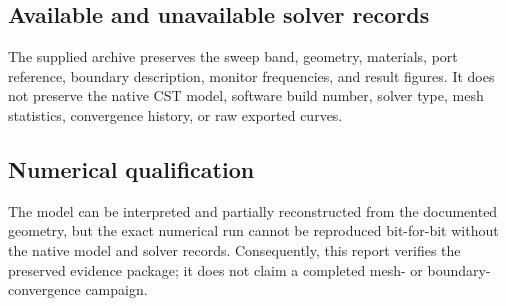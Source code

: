 \subsection{Available and unavailable solver records}
The supplied archive preserves the sweep band, geometry, materials, port reference,
boundary description, monitor frequencies, and result figures. It does not preserve the
native CST model, software build number, solver type, mesh statistics, convergence
history, or raw exported curves.

\subsection{Numerical qualification}
The model can be interpreted and partially reconstructed from the documented geometry,
but the exact numerical run cannot be reproduced bit-for-bit without the native model
and solver records. Consequently, this report verifies the preserved evidence package;
it does not claim a completed mesh- or boundary-convergence campaign.
